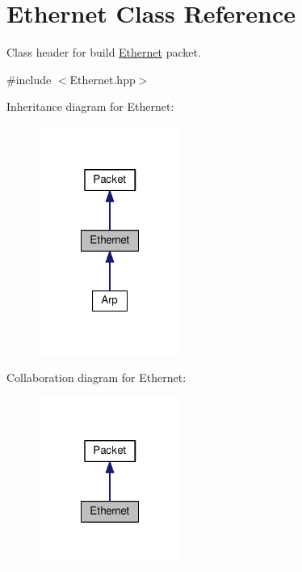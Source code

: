 \hypertarget{class_ethernet}{\section{Ethernet Class Reference}
\label{class_ethernet}
}


Class header for build \hyperlink{class_ethernet}{Ethernet} packet.  




{\ttfamily \#include $<$Ethernet.\-hpp$>$}



Inheritance diagram for Ethernet\-:\nopagebreak
\begin{figure}[H]
\begin{center}
\leavevmode
\includegraphics[width=132pt]{class_ethernet__inherit__graph}
\end{center}
\end{figure}


Collaboration diagram for Ethernet\-:\nopagebreak
\begin{figure}[H]
\begin{center}
\leavevmode
\includegraphics[width=132pt]{class_ethernet__coll__graph}
\end{center}
\end{figure}

